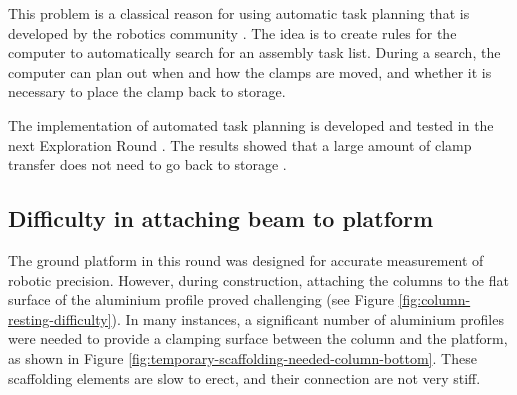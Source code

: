 This problem is a classical reason for using automatic task planning that is developed by the robotics community \parencite{ghallabAutomatedPlanningActing2016}. The idea is to create rules for the computer to automatically search for an assembly task list. During a search, the computer can plan out when and how the clamps are moved, and whether it is necessary to place the clamp back to storage.

The implementation of automated task planning is developed and tested in the next Exploration Round . The results showed that a large amount of clamp transfer does not need to go back to storage .

\subsection{Difficulty in attaching beam to platform}
\label{subsection:exploration-3-difficulty-in-attaching-beam-to-platform}

The ground platform in this round was designed for accurate measurement of robotic precision. However, during construction, attaching the columns to the flat surface of the aluminium profile proved challenging (see Figure \ref{fig:column-resting-difficulty}). In many instances, a significant number of aluminium profiles were needed to provide a clamping surface between the column and the platform, as shown in Figure \ref{fig:temporary-scaffolding-needed-column-bottom}. These scaffolding elements are slow to erect, and their connection are not very stiff.

